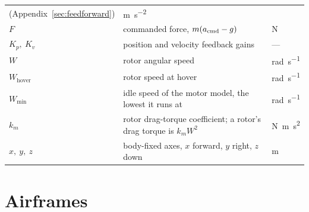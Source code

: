 \documentclass[11pt,a4paper]{article}
\begin{document}
\begin{center}
\begin{tabular}{@{}l l l@{}}
    (Appendix~\ref{sec:feedforward}) & \si{\metre\per\second\squared} \\
  $F$ & commanded force, $m(a_{\rm cmd} - g)$ & \si{\newton} \\
  $K_p,\ K_v$ & position and velocity feedback gains & --- \\
  $W$ & rotor angular speed & \si{\radian\per\second} \\
  $W_{\text{hover}}$ & rotor speed at hover & \si{\radian\per\second} \\
  $W_{\min}$ & idle speed of the motor model, the lowest it runs at & \si{\radian\per\second} \\
  $k_m$ & rotor drag-torque coefficient; a rotor's drag torque is $k_m W^2$ &
    \si{\newton\metre\second\squared} \\
  $x,\ y,\ z$ & body-fixed axes, $x$ forward, $y$ right, $z$ down & \si{\metre} \\
  \bottomrule
\end{tabular}
\end{center}

\section{Airframes}
\end{document}
